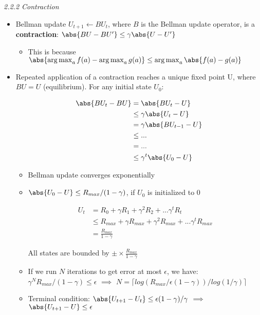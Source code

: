 \documentclass[12pt]{article}
\begin{document}
\noindent
\textsl{2.2.2 Contraction}
\begin{itemize}
\item Bellman update $U_{t+1} \gets BU_t$, where $B$ is the Bellman update operator, is a \textbf{contraction}: $\abs{BU - BU'} \leq \gamma \abs{U - U'}$
\begin{itemize}
\item This is because $\abs{\operatorname*{arg\,max}_{a}{f(a)} - \operatorname*{arg\,max}_{a}{g(a)} } \leq \operatorname*{arg\,max}_{a}{\abs{f(a) - g(a)}  } $
\end{itemize}

\item Repeated application of a contraction reaches a unique fixed point U, where $BU = U$ (equilibrium).
For any initial state $U_0$:

\begin{equation}
\begin{split}
\abs{BU_t - BU} & = \abs{BU_t - U}  \\
 & \leq \gamma \abs{U_t - U} \\
 & = \gamma \abs{BU_{t-1} - U} \\
 & \leq ... \\
 & = ... \\
 & \leq \gamma^{t} \abs{U_0 - U } \\
\end{split}
\end{equation}

\begin{itemize}
\item Bellman update converges exponentially 
\item $\abs{U_0 - U} \leq R_{max}/(1 - \gamma)$, if $U_0$ is initialized to 0

\begin{equation}
\begin{split}
U_t  & = R_0 + \gamma R_1 + \gamma^2 R_2 + ... \gamma^{t}R_t  \\
 &\leq R_{max} + \gamma R_{max} + \gamma^2 R_{max} + ... \gamma^{t}R_{max}\\
 & = \frac{R_{max}}{1-\gamma}
\end{split}
\end{equation}

All states are bounded by $\pm \times \frac{R_{max}}{1-\gamma}$

\item If we run $N$ iterations to get error at most $\epsilon$, we have: \\
  $\gamma^N R_{max}/(1 - \gamma) \leq \epsilon$  $\implies$ $N =\lceil  log(R_{max}/ \epsilon(1-\gamma))/log(1/\gamma)\rceil$
  
 \item Terminal condition: $\abs{U_{t+1} - U_t} \leq \epsilon(1-\gamma)/\gamma$ $\implies$ $\abs{U_{t+1} - U} \leq \epsilon$ 
\end{itemize}
\end{itemize}
\end{document}
